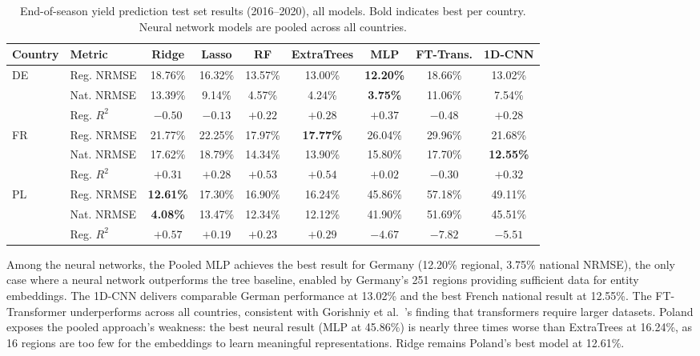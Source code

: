 \documentclass[pdflatex,sn-mathphys-num, oneside, 11pt]{sn-jnl}%
\theoremstyle{thmstyleone}%
\theoremstyle{thmstyletwo}%
\theoremstyle{thmstylethree}%
\begin{document}
\begin{table}[ht!]
\centering
\caption{End-of-season yield prediction test set results (2016--2020), all models. Bold indicates best per country. Neural network models are pooled across all countries.}
\label{tab:yield_comparison}
\footnotesize
\setlength{\tabcolsep}{3.5pt}
\begin{tabular}{@{}ll ccccccc @{}}
\toprule
\textbf{Country} & \textbf{Metric} & \textbf{Ridge} & \textbf{Lasso}
  & \textbf{RF} & \textbf{ExtraTrees} & \textbf{MLP} & \textbf{FT-Trans.} & \textbf{1D-CNN} \\
\midrule
\multirow{3}{*}{DE}
  & Reg. NRMSE  & 18.76\% & 16.32\% & 13.57\% & 13.00\% & \textbf{12.20\%} & 18.66\% & 13.02\% \\
  & Nat. NRMSE  & 13.39\% &  9.14\% &  4.57\% & 4.24\%  & \textbf{3.75\%}  & 11.06\% &  7.54\% \\
  & Reg. $R^2$  & $-0.50$ & $-0.13$ & $+0.22$ & $+0.28$ & \textbf{$+0.37$} & $-0.48$ & $+0.28$ \\
\midrule
\multirow{3}{*}{FR}
  & Reg. NRMSE  & 21.77\% & 22.25\% & 17.97\% & \textbf{17.77\%} & 26.04\% & 29.96\% & 21.68\% \\
  & Nat. NRMSE  & 17.62\% & 18.79\% & 14.34\% & 13.90\%          & 15.80\% & 17.70\% & \textbf{12.55\%} \\
  & Reg. $R^2$  & $+0.31$ & $+0.28$ & $+0.53$ & \textbf{$+0.54$} & $+0.02$ & $-0.30$ & $+0.32$ \\
\midrule
\multirow{3}{*}{PL}
  & Reg. NRMSE  & \textbf{12.61\%} & 17.30\% & 16.90\% & 16.24\% & 45.86\% & 57.18\% & 49.11\% \\
  & Nat. NRMSE  & \textbf{4.08\%}  & 13.47\% & 12.34\% & 12.12\% & 41.90\% & 51.69\% & 45.51\% \\
  & Reg. $R^2$  & \textbf{$+0.57$} & $+0.19$ & $+0.23$ & $+0.29$ & $-4.67$ & $-7.82$ & $-5.51$ \\
\bottomrule
\end{tabular}
\end{table}
Among the neural networks, the Pooled MLP achieves the best result for Germany (12.20\% regional, 3.75\% national NRMSE), the only case where a neural network outperforms the tree baseline, enabled by Germany's 251 regions providing sufficient data for entity embeddings. The 1D-CNN delivers comparable German performance at 13.02\% and the best French national result at 12.55\%. The FT-Transformer underperforms across all countries, consistent with Gorishniy et al.~\cite{bib_gorishniy}'s finding that transformers require larger datasets. Poland exposes the pooled approach's weakness: the best neural result (MLP at 45.86\%) is nearly three times worse than ExtraTrees at 16.24\%, as 16 regions are too few for the embeddings to learn meaningful representations. Ridge remains Poland's best model at 12.61\%.\\
\end{document}
